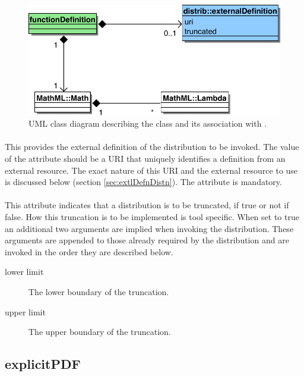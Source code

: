 \documentclass[draftspec]{sbmlpkgspec}
\begin{document}
\begin{figure}[htb]
\includegraphics[width=0.75\linewidth]{externalDefinitionUML}
\caption{UML class diagram describing the 
  class and its association with .}
\label{fig:externalDefinitionUml}
\end{figure}

\paragraph{}

This provides the external definition of the distribution to be
invoked. The value of the attribute should be a URI that
uniquely identifies a definition from an external resource. The exact
nature of this URI and the external resource to use is discussed below
(section \ref{sec:extlDefnDistn}). The attribute is mandatory.

\paragraph{}
\label{sec:truncatt}

This attribute indicates that a distribution is to be truncated, if
true or not if false. How this truncation is to be implemented is tool
specific. When set to true an additional two arguments are implied
when invoking the distribution. These arguments are appended to
those already required by the distribution and are invoked in the
order they are described below.

\begin{description}
\item[lower limit] The lower boundary of the truncation.
\item[upper limit] The upper boundary of the truncation.
\end{description}

\subsection{explicitPDF}
\end{document}
